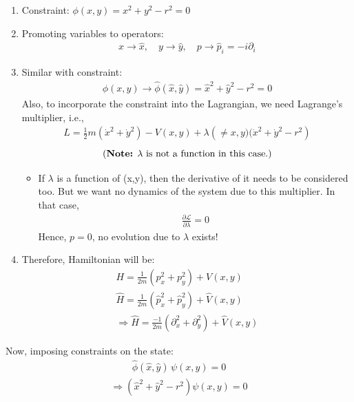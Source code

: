 \documentclass[14pt]{article} %
\begin{document}
\begin{enumerate}
    \item Constraint: \quad $\phi(x,y) = x^2 + y^2 - r^2 = 0$
    \item Promoting variables to operators:
\begin{align*}
    x \rightarrow \hat{x}, \quad y \rightarrow \hat{y}, \quad p \rightarrow \hat{p}_i = -i \partial_i
\end{align*}
    \item Similar with constraint: 
\begin{align*}
    \phi(x,y) \rightarrow \hat{\phi}(\hat{x},\hat{y}) = \hat{x}^2 + \hat{y}^2 - r^2 = 0
\end{align*}
    Also, to incorporate the constraint into the Lagrangian, we need Lagrange's multiplier, i.e.,
\begin{align*}
L = \frac{1}{2} m (\dot{x}^2 + \dot{y}^2) - V(x,y) + \lambda \left(\neq x,y)(\dot{x}^2 + \dot{y}^2- r^2 \right)
\end{align*}
$$ \text{(\textbf{Note:} $\lambda$ is not a function in this case.)} $$
\begin{itemize}
\item If $\lambda$ is a function of (x,y), then the derivative of it needs to be considered too. But we want no dynamics of the system due to this multiplier. In that case,
\begin{align*}
\frac{\partial \mathcal{L}}{\partial \lambda} = 0
\end{align*}
Hence, $p = 0$, no evolution due to $\lambda$ exists!
\end{itemize}
    
    \item Therefore, Hamiltonian will be:
    \begin{align*}
        H = \frac{1}{2m}\left( p_x^2 + p_y^2 \right) + V(x,y) \tag{7} \label{eq:7} \\
        \hat{H} = \frac{1}{2m}\left( \hat{p}_x^2 + \hat{p}_y^2 \right) + \hat{V}(x,y) \\
        \Rightarrow \hat{H} = \frac{-1}{2m}\left( \partial_x^2 + \partial_y^2 \right) + \hat{V}(x,y)
    \end{align*}
\end{enumerate}
Now, imposing constraints on the state:
\begin{align*}
\hat{\phi}(\hat{x},\hat{y}) \, \psi(x,y) = 0
\end{align*}
\begin{align*}
\Rightarrow \left( \hat{x}^2 + \hat{y}^2 - r^2 \right) \psi(x,y) = 0
\end{align*}
\end{document}
